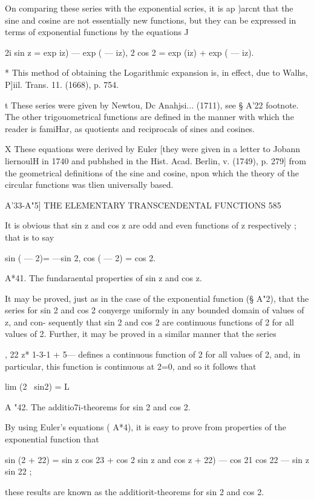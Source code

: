 On comparing these series with the exponential scries, it is ap )arcnt that the sine and 
cosine are not essentially new functions, but they can be expressed in terms of exponential 
functions by the equations J 

2i sin z = exp  iz) — exp ( — iz), 2 cos 2 = exp (iz) + exp ( — iz). 

* This method of obtaining the Logarithmic expansion is, in effect, due to Walhs, P]iil. 
Trans. 11. (1668), p. 754. 

t These series were given by Newtou, Dc Anahjsi... (1711), see § A'22 footnote. The other 
trigouometrical functions are defined in the manner with which the reader is famiHar, as 
quotients and reciprocals of sines and cosines. 

X These equations were derived by Euler [they were given in a letter to Jobann liernoulH in 
1740 and pubhshed in the Hist. Acad. Berlin, v. (1749), p. 279] from the geometrical definitions 
of the sine and cosine, npon which the theory of the circular functions was tlien universally 
based. 



A'33-A"5] THE ELEMENTARY TRANSCENDENTAL FUNCTIONS 585 

It is obvious that sin z and cos z are odd and even functions of z respectively ; that is 
to say 

sin ( — 2)= —sin 2, cos ( — 2) = cos 2. 

A*41. The fundaraental properties of sin z and cos z. 

It may be proved, just as in the case of the exponential function (§ A"2), that the series 
for sin 2 and cos 2 conyerge uniformly in any bounded domain of values of z, and con- 
sequently that sin 2 and cos 2 are continuous functions of 2 for all values of 2. 
Further, it may be proved in a similar manner that the series 

, 22 z* 
1-3-1 + 5--- 
defines a continuous function of 2 for all values of 2, and, in particular, this function 
is continuous at 2=0, and so it follows that 

lim (2~ sin2) = L 

A "42. The additio7i-theorems for sin 2 and cos 2. 

By using Euler's equations (  A*4), it is easy to prove from properties of the exponential 
function that 

sin (2  + 22) = sin z  cos 23 + cos 2  sin z  
and cos  z  + 22) — cos 21 cos 22 — sin z  sin 22 ; 

these results are known as the additiorit-theorems for sin 2 and cos 2. 

